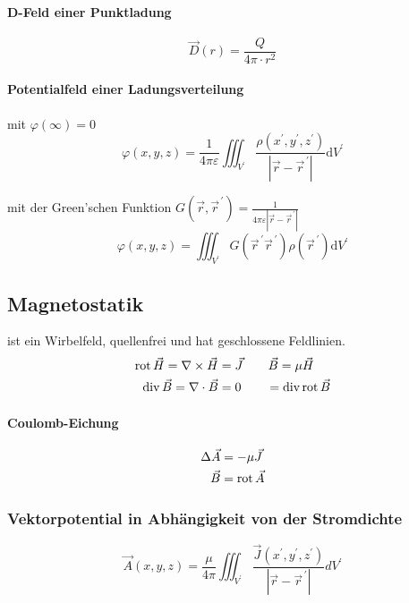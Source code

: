 \paragraph*{D-Feld einer Punktladung}
\[ \vec{D}(r) = \dfrac{Q}{4 \pi \cdot r^2}\]

\paragraph*{Potentialfeld einer Ladungsverteilung}
mit $\varphi(\infty)=0$
\[\varphi(x, y, z)=\frac{1}{4 \pi \varepsilon} \iiint_{V^{\prime}} \frac{\rho\left(x^{\prime}, y^{\prime}, z^{\prime}\right)}{\left|\vec{r}-\vec{r}^{\,\prime}\right|} \mathrm{d} V^{\prime}\]

mit der Green'schen Funktion $G\left(\vec{r}, \vec{r}^{\,\prime}\right)=\frac{1}{4 \pi \varepsilon\left|\vec{r}-\vec{r}^{\,\prime}\right|}$
\[\varphi(x, y, z)=\iiint_{V^{\prime}} G\left(\vec{r}^{\,\prime} \vec{r}^{\,\prime}\right) \rho\left(\vec{r}^{\,\prime}\right) \mathrm{d} V^{\prime}\]


\subsection{Magnetostatik}
ist ein Wirbelfeld, quellenfrei und hat geschlossene Feldlinien.
\begin{align*}
    \operatorname{rot} \vec{H} = \nabla \times \vec{H} & = \vec{J}  \qquad \vec{B} = \mu \vec{H}   \\
    \operatorname{div} \vec{B} = \nabla \cdot \vec{B}  & = 0        \qquad = \operatorname{div} \operatorname{rot} \vec{B}
\end{align*}

\paragraph*{Coulomb-Eichung}
\begin{align*}
    \Delta \vec{A} & = - \mu \vec{J}  \\
    \vec{B}        & = \operatorname{rot} \vec{A}
\end{align*}

\subsubsection{Vektorpotential in Abhängigkeit von der Stromdichte}
\[ \vec{A}(x, y, z)=\frac{\mu}{4 \pi} \iiint_{V^{\prime}} \frac{\vec{J}\left(x^{\prime}, y^{\prime}, z^{\prime}\right)}{\left|\vec{r}-\vec{r}^{\,\prime}\right|} d V^{\prime} \]


